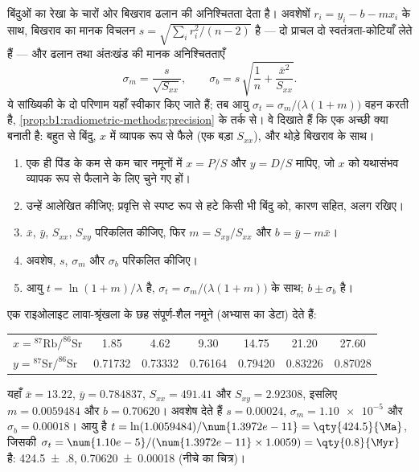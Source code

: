 बिंदुओं का रेखा के चारों ओर बिखराव ढलान की अनिश्चितता देता है। अवशेषों $r_i = y_i - b - m x_i$ के साथ, बिखराव का मानक विचलन $s = \sqrt{\sum_i r_i^2/(n-2)}$ है --- दो प्राचल दो स्वतंत्रता-कोटियाँ लेते हैं --- और ढलान तथा अंतःखंड की मानक अनिश्चितताएँ
\[
  \sigma_m = \frac{s}{\sqrt{S_{xx}}}, \qquad
  \sigma_b = s\,\sqrt{\frac1n + \frac{\bar x^2}{S_{xx}}} .
\]
ये सांख्यिकी के दो परिणाम यहाँ स्वीकार किए जाते हैं; तब आयु $\sigma_t = \sigma_m/\bigl(\lambda(1 + m)\bigr)$ वहन करती है, \cref{prop:b1:radiometric-methods:precision} के तर्क से। वे दिखाते हैं कि एक अच्छी  क्या बनाती है: बहुत से बिंदु, $x$ में व्यापक रूप से फैले (एक बड़ा $S_{xx}$), और थोड़े बिखराव के साथ।

\begin{method}[समतापरेखा का अनुरूपण]\label{met:b1:radiometric-methods:isochron}
\begin{enumerate}
  \item एक ही पिंड के कम से कम चार नमूनों में $x = P/S$ और $y = D/S$ मापिए, जो $x$ को यथासंभव व्यापक रूप से फैलाने के लिए चुने गए हों।
  \item उन्हें आलेखित कीजिए; प्रवृत्ति से स्पष्ट रूप से हटे किसी भी बिंदु को, कारण सहित, अलग रखिए।
  \item $\bar x$, $\bar y$, $S_{xx}$, $S_{xy}$ परिकलित कीजिए, फिर $m = S_{xy}/S_{xx}$ और $b = \bar y - m \bar x$।
  \item अवशेष, $s$, $\sigma_m$ और $\sigma_b$ परिकलित कीजिए।
  \item आयु $t = \ln(1+m)/\lambda$ है, $\sigma_t =
        \sigma_m/\bigl(\lambda(1+m)\bigr)$ के साथ;  $b \pm \sigma_b$ है।
\end{enumerate}
\end{method}

\begin{example}[एक आविष्कृत राइओलाइट]\label{ex:b1:radiometric-methods:rhyolite}
एक राइओलाइट लावा-श्रृंखला के छह संपूर्ण-शैल नमूने (अभ्यास का डेटा) देते हैं:
\begin{center}
\small
\begin{tabular}{|l|cccccc|}
\hline
$x = {}^{87}\mathrm{Rb}/^{86}\mathrm{Sr}$ & 1.85 & 4.62 & 9.30 & 14.75 & 21.20 & 27.60 \\
$y = {}^{87}\mathrm{Sr}/^{86}\mathrm{Sr}$ & 0.71732 & 0.73332 & 0.76164 & 0.79420 & 0.83226 & 0.87028 \\
\hline
\end{tabular}
\end{center}
यहाँ $\bar x = 13.22$, $\bar y = 0.784837$, $S_{xx} = 491.41$ और $S_{xy} = 2.92308$, इसलिए $m = 0.0059484$ और $b = 0.70620$। अवशेष देते हैं $s = 0.00024$, $\sigma_m = \num{1.10e-5}$ और $\sigma_b = 0.00018$। आयु है $t = \ln(1.0059484)/\num{1.3972e-11} = \qty{424.5}{\Ma}$, जिसकी $\sigma_t = \num{1.10e-5}/(\num{1.3972e-11} \times 1.0059) = \qty{0.8}{\Myr}$ है: \qty[uncertainty-mode=separate]{424.5(8)}{\Ma},  \num[uncertainty-mode=separate]{0.70620(18)} (नीचे का चित्र)।
\end{example}

